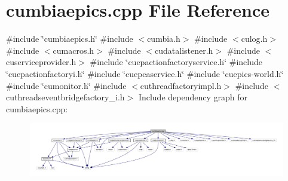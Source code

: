 \section{cumbiaepics.\+cpp File Reference}
\label{cumbiaepics_8cpp}
{\ttfamily \#include \char`\"{}cumbiaepics.\+h\char`\"{}}\newline
{\ttfamily \#include $<$cumbia.\+h$>$}\newline
{\ttfamily \#include $<$culog.\+h$>$}\newline
{\ttfamily \#include $<$cumacros.\+h$>$}\newline
{\ttfamily \#include $<$cudatalistener.\+h$>$}\newline
{\ttfamily \#include $<$cuserviceprovider.\+h$>$}\newline
{\ttfamily \#include \char`\"{}cuepactionfactoryservice.\+h\char`\"{}}\newline
{\ttfamily \#include \char`\"{}cuepactionfactoryi.\+h\char`\"{}}\newline
{\ttfamily \#include \char`\"{}cuepcaservice.\+h\char`\"{}}\newline
{\ttfamily \#include \char`\"{}cuepics-\/world.\+h\char`\"{}}\newline
{\ttfamily \#include \char`\"{}cumonitor.\+h\char`\"{}}\newline
{\ttfamily \#include $<$cuthreadfactoryimpl.\+h$>$}\newline
{\ttfamily \#include $<$cuthreadseventbridgefactory\+\_\+i.\+h$>$}\newline
Include dependency graph for cumbiaepics.\+cpp\+:\nopagebreak
\begin{figure}[H]
\begin{center}
\leavevmode
\includegraphics[width=350pt]{cumbiaepics_8cpp__incl}
\end{center}
\end{figure}
